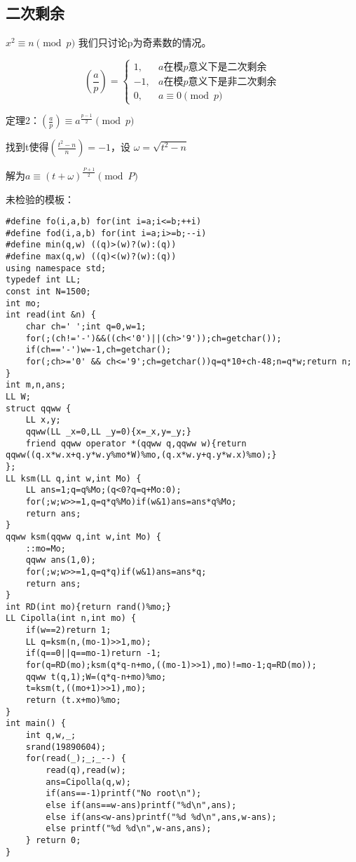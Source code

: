 \subsection{二次剩余}

$x^2\equiv n\pmod p$ 我们只讨论p为奇素数的情况。 

$$
\left(\frac{a}{p}\right)=
\begin{cases}
1,&a\text{在模$p$意义下是二次剩余}\\
-1,&a\text{在模$p$意义下是非二次剩余}\\
0,&a\equiv0\pmod p
\end{cases}
$$

定理2：$\left(\frac{a}{p}\right)\equiv a^{\frac{p-1}{2}}\pmod p$

找到t使得$\left( \frac{t^2-n}{n} \right)=-1$，设 $\omega=\sqrt{t^2-n}$

解为$a\equiv(t+\omega)^{\frac{P+1}{2}} \pmod{P}$

未检验的模板：
\begin{lstlisting}
#define fo(i,a,b) for(int i=a;i<=b;++i)
#define fod(i,a,b) for(int i=a;i>=b;--i)
#define min(q,w) ((q)>(w)?(w):(q))
#define max(q,w) ((q)<(w)?(w):(q))
using namespace std;
typedef int LL;
const int N=1500;
int mo;
int read(int &n) {
    char ch=' ';int q=0,w=1;
    for(;(ch!='-')&&((ch<'0')||(ch>'9'));ch=getchar());
    if(ch=='-')w=-1,ch=getchar();
    for(;ch>='0' && ch<='9';ch=getchar())q=q*10+ch-48;n=q*w;return n;
}
int m,n,ans;
LL W;
struct qqww {
    LL x,y;
    qqww(LL _x=0,LL _y=0){x=_x,y=_y;}
    friend qqww operator *(qqww q,qqww w){return qqww((q.x*w.x+q.y*w.y%mo*W)%mo,(q.x*w.y+q.y*w.x)%mo);}
};
LL ksm(LL q,int w,int Mo) {
    LL ans=1;q=q%Mo;(q<0?q=q+Mo:0);
    for(;w;w>>=1,q=q*q%Mo)if(w&1)ans=ans*q%Mo;
    return ans;
}
qqww ksm(qqww q,int w,int Mo) {
    ::mo=Mo;
    qqww ans(1,0);
    for(;w;w>>=1,q=q*q)if(w&1)ans=ans*q;
    return ans;
}
int RD(int mo){return rand()%mo;}
LL Cipolla(int n,int mo) {
    if(w==2)return 1;
    LL q=ksm(n,(mo-1)>>1,mo);
    if(q==0||q==mo-1)return -1;
    for(q=RD(mo);ksm(q*q-n+mo,((mo-1)>>1),mo)!=mo-1;q=RD(mo));
    qqww t(q,1);W=(q*q-n+mo)%mo;
    t=ksm(t,((mo+1)>>1),mo);
    return (t.x+mo)%mo;
}
int main() {
    int q,w,_;
    srand(19890604);
    for(read(_);_;_--) {
        read(q),read(w);
        ans=Cipolla(q,w);
        if(ans==-1)printf("No root\n");
        else if(ans==w-ans)printf("%d\n",ans);
        else if(ans<w-ans)printf("%d %d\n",ans,w-ans);
        else printf("%d %d\n",w-ans,ans);
    } return 0;
}
\end{lstlisting}


